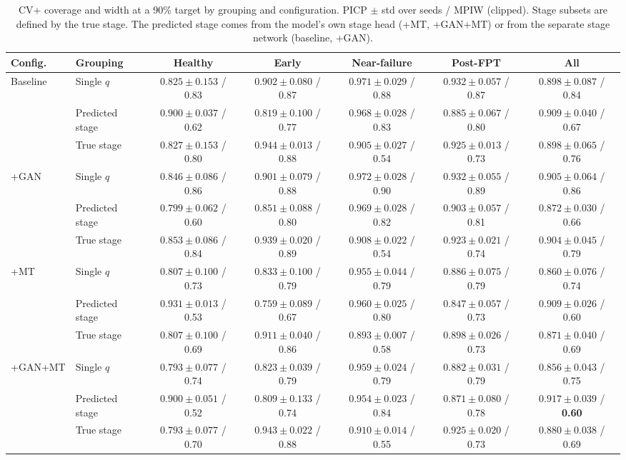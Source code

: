 \begin{table}[!htbp]
\centering
\caption{CV+ coverage and width at a 90\% target by grouping and
configuration. PICP $\pm$ std over seeds / MPIW (clipped). Stage
subsets are defined by the true stage. The predicted stage comes from
the model's own stage head (+MT, +GAN+MT) or from the separate stage
network (baseline, +GAN).}
\label{tab:intervals}
\scriptsize
\renewcommand{\arraystretch}{1.2}
\setlength{\tabcolsep}{2.5pt}
\begin{tabular}{llccccc}
\toprule
\textbf{Config.} & \textbf{Grouping} & \textbf{Healthy} & \textbf{Early} &
\textbf{Near-failure} & \textbf{Post-FPT} & \textbf{All} \\
\midrule
\multirow{3}{*}{Baseline}
 & Single $q$      & $0.825 \pm 0.153$ / 0.83 & $0.902 \pm 0.080$ / 0.87 & $0.971 \pm 0.029$ / 0.88 & $0.932 \pm 0.057$ / 0.87 & $0.898 \pm 0.087$ / 0.84 \\
 & Predicted stage & $0.900 \pm 0.037$ / 0.62 & $0.819 \pm 0.100$ / 0.77 & $0.968 \pm 0.028$ / 0.83 & $0.885 \pm 0.067$ / 0.80 & $0.909 \pm 0.040$ / 0.67 \\
 & True stage      & $0.827 \pm 0.153$ / 0.80 & $0.944 \pm 0.013$ / 0.88 & $0.905 \pm 0.027$ / 0.54 & $0.925 \pm 0.013$ / 0.73 & $0.898 \pm 0.065$ / 0.76 \\
\midrule
\multirow{3}{*}{+GAN}
 & Single $q$      & $0.846 \pm 0.086$ / 0.86 & $0.901 \pm 0.079$ / 0.88 & $0.972 \pm 0.028$ / 0.90 & $0.932 \pm 0.055$ / 0.89 & $0.905 \pm 0.064$ / 0.86 \\
 & Predicted stage & $0.799 \pm 0.062$ / 0.60 & $0.851 \pm 0.088$ / 0.80 & $0.969 \pm 0.028$ / 0.82 & $0.903 \pm 0.057$ / 0.81 & $0.872 \pm 0.030$ / 0.66 \\
 & True stage      & $0.853 \pm 0.086$ / 0.84 & $0.939 \pm 0.020$ / 0.89 & $0.908 \pm 0.022$ / 0.54 & $0.923 \pm 0.021$ / 0.74 & $0.904 \pm 0.045$ / 0.79 \\
\midrule
\multirow{3}{*}{+MT}
 & Single $q$      & $0.807 \pm 0.100$ / 0.73 & $0.833 \pm 0.100$ / 0.79 & $0.955 \pm 0.044$ / 0.79 & $0.886 \pm 0.075$ / 0.79 & $0.860 \pm 0.076$ / 0.74 \\
 & Predicted stage & $0.931 \pm 0.013$ / 0.53 & $0.759 \pm 0.089$ / 0.67 & $0.960 \pm 0.025$ / 0.80 & $0.847 \pm 0.057$ / 0.73 & $0.909 \pm 0.026$ / 0.60 \\
 & True stage      & $0.807 \pm 0.100$ / 0.69 & $0.911 \pm 0.040$ / 0.86 & $0.893 \pm 0.007$ / 0.58 & $0.898 \pm 0.026$ / 0.73 & $0.871 \pm 0.040$ / 0.69 \\
\midrule
\multirow{3}{*}{+GAN+MT}
 & Single $q$      & $0.793 \pm 0.077$ / 0.74 & $0.823 \pm 0.039$ / 0.79 & $0.959 \pm 0.024$ / 0.79 & $0.882 \pm 0.031$ / 0.79 & $0.856 \pm 0.043$ / 0.75 \\
 & Predicted stage & $0.900 \pm 0.051$ / 0.52 & $0.809 \pm 0.133$ / 0.74 & $0.954 \pm 0.023$ / 0.84 & $0.871 \pm 0.080$ / 0.78 & $\mathbf{0.917 \pm 0.039}$ / \textbf{0.60} \\
 & True stage      & $0.793 \pm 0.077$ / 0.70 & $0.943 \pm 0.022$ / 0.88 & $0.910 \pm 0.014$ / 0.55 & $0.925 \pm 0.020$ / 0.73 & $0.880 \pm 0.038$ / 0.69 \\
\bottomrule
\end{tabular}
\end{table}

